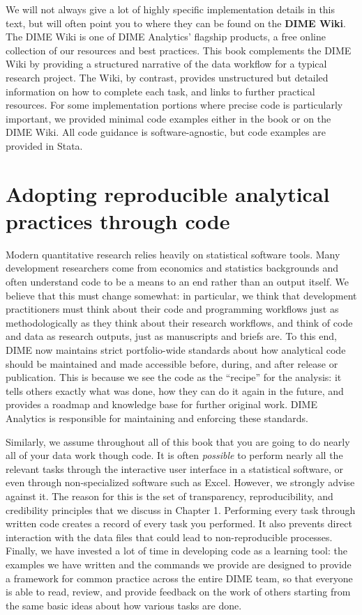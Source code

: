 We will not always give a lot of highly specific implementation details in this text,
but will often point you to where they can be found on the \textbf{DIME Wiki}.
The DIME Wiki is one of DIME Analytics' flagship products,
a free online collection of our resources and best practices.
This book complements the DIME Wiki by providing a structured narrative
of the data workflow for a typical research project.
The Wiki, by contrast, provides unstructured but detailed information
on how to complete each task, and links to further practical resources.
For some implementation portions where precise code is particularly important,
we provided minimal code examples either in the book or on the DIME Wiki.
All code guidance is software-agnostic, but code examples are provided in Stata.

\section{Adopting reproducible analytical practices through code}

Modern quantitative research relies heavily on statistical software tools.
Many development researchers come from economics and statistics backgrounds
and often understand code to be a means to an end rather than an output itself.
We believe that this must change somewhat:
in particular, we think that development practitioners
must think about their code and programming workflows
just as methodologically as they think about their research workflows,
and think of code and data as research outputs, just as manuscripts and briefs are.
To this end, DIME now maintains strict portfolio-wide standards
about how analytical code should be maintained and made accessible
before, during, and after release or publication.
This is because we see the code as the ``recipe'' for the analysis:
it tells others exactly what was done,
how they can do it again in the future,
and provides a roadmap and knowledge base for further original work.
DIME Analytics is responsible for maintaining and enforcing these standards.

Similarly, we assume throughout all of this book
that you are going to do nearly all of your data work though code.
It is often \textit{possible} to perform nearly all the relevant tasks
through the interactive user interface in a statistical software,
or even through non-specialized software such as Excel.
However, we strongly advise against it.
The reason for this is the set of
transparency, reproducibility, and credibility principles
that we discuss in Chapter 1.
Performing every task through written code
creates a record of every task you performed.
It also prevents direct interaction
with the data files that could lead to non-reproducible processes.
Finally, we have invested a lot of time in developing code as a learning tool:
the examples we have written and the commands we provide
are designed to provide a framework for common practice
across the entire DIME team, so that everyone is able to
read, review, and provide feedback on the work of others
starting from the same basic ideas about how various tasks are done.


